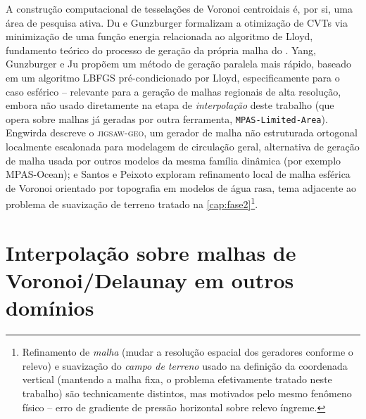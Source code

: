 A construção computacional de tesselações de Voronoi centroidais é, por
si, uma área de pesquisa ativa. Du e Gunzburger
\cite{dugunzburger2002cvt} formalizam a otimização de CVTs via
minimização de uma função energia relacionada ao algoritmo de Lloyd,
fundamento teórico do processo de geração da própria malha do \mpasa{}.
Yang, Gunzburger e Ju \cite{yang2017cvtsphere} propõem um método de
geração paralela mais rápido, baseado em um algoritmo LBFGS
pré-condicionado por Lloyd, especificamente para o caso esférico --
relevante para a geração de malhas regionais de alta resolução, embora
não usado diretamente na etapa de \emph{interpolação} deste trabalho (que
opera sobre malhas já geradas por outra ferramenta,
\texttt{MPAS-Limited-Area}). Engwirda \cite{engwirda2017jigsawgeo}
descreve o \textsc{jigsaw-geo}, um gerador de malha não estruturada
ortogonal localmente escalonada para modelagem de circulação geral,
alternativa de geração de malha usada por outros modelos da mesma
família dinâmica (por exemplo MPAS-Ocean); e Santos e Peixoto
\cite{santospeixoto2021refinement} exploram refinamento local de malha
esférica de Voronoi orientado por topografia em modelos de água rasa,
tema adjacente ao problema de suavização de terreno tratado na
\cref{cap:fase2}\footnote{Refinamento de \emph{malha} (mudar a resolução
espacial dos geradores conforme o relevo) e suavização do \emph{campo de
terreno} usado na definição da coordenada vertical (mantendo a malha
fixa, o problema efetivamente tratado neste trabalho) são technicamente
distintos, mas motivados pelo mesmo fenômeno físico -- erro de gradiente
de pressão horizontal sobre relevo íngreme.}.

\section{Interpolação sobre malhas de Voronoi/Delaunay em outros domínios}

